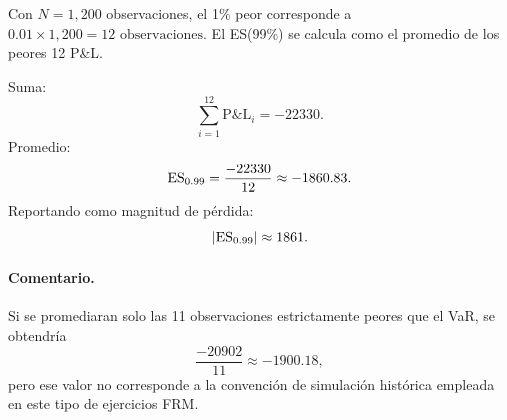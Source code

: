     Con \(N=1{,}200\) observaciones, el 1\% peor corresponde a $0.01\times 1{,}200=12 \text{ observaciones.}$
    El ES(99\%) se calcula como el promedio de los peores 12 P\&L.

    Suma:
    \[
    \sum_{i=1}^{12} \text{P\&L}_i=-22330.
    \]
    Promedio:
    \[
    \mathrm{ES}_{0.99}=\frac{-22330}{12}\approx -1860.83.
    \]
    Reportando como magnitud de pérdida:
    \[
    |\mathrm{ES}_{0.99}|\approx 1861.
    \]

    
\paragraph{Comentario.}
Si se promediaran solo las 11 observaciones estrictamente peores que el VaR,
se obtendría
\[
\frac{-20902}{11}\approx -1900.18,
\]
pero ese valor no corresponde a la convención de simulación histórica empleada
en este tipo de ejercicios FRM.










